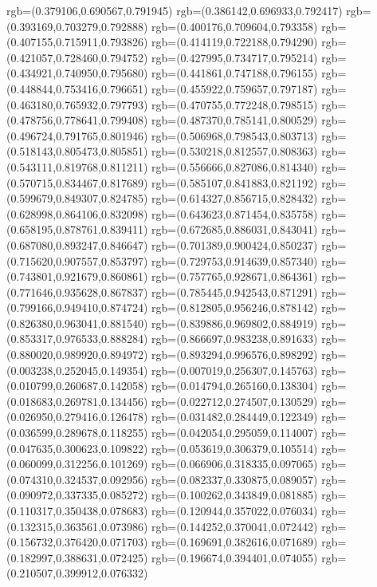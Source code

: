 {{{			rgb=(0.379106,0.690567,0.791945)
			rgb=(0.386142,0.696933,0.792417)
			rgb=(0.393169,0.703279,0.792888)
			rgb=(0.400176,0.709604,0.793358)
			rgb=(0.407155,0.715911,0.793826)
			rgb=(0.414119,0.722188,0.794290)
			rgb=(0.421057,0.728460,0.794752)
			rgb=(0.427995,0.734717,0.795214)
			rgb=(0.434921,0.740950,0.795680)
			rgb=(0.441861,0.747188,0.796155)
			rgb=(0.448844,0.753416,0.796651)
			rgb=(0.455922,0.759657,0.797187)
			rgb=(0.463180,0.765932,0.797793)
			rgb=(0.470755,0.772248,0.798515)
			rgb=(0.478756,0.778641,0.799408)
			rgb=(0.487370,0.785141,0.800529)
			rgb=(0.496724,0.791765,0.801946)
			rgb=(0.506968,0.798543,0.803713)
			rgb=(0.518143,0.805473,0.805851)
			rgb=(0.530218,0.812557,0.808363)
			rgb=(0.543111,0.819768,0.811211)
			rgb=(0.556666,0.827086,0.814340)
			rgb=(0.570715,0.834467,0.817689)
			rgb=(0.585107,0.841883,0.821192)
			rgb=(0.599679,0.849307,0.824785)
			rgb=(0.614327,0.856715,0.828432)
			rgb=(0.628998,0.864106,0.832098)
			rgb=(0.643623,0.871454,0.835758)
			rgb=(0.658195,0.878761,0.839411)
			rgb=(0.672685,0.886031,0.843041)
			rgb=(0.687080,0.893247,0.846647)
			rgb=(0.701389,0.900424,0.850237)
			rgb=(0.715620,0.907557,0.853797)
			rgb=(0.729753,0.914639,0.857340)
			rgb=(0.743801,0.921679,0.860861)
			rgb=(0.757765,0.928671,0.864361)
			rgb=(0.771646,0.935628,0.867837)
			rgb=(0.785445,0.942543,0.871291)
			rgb=(0.799166,0.949410,0.874724)
			rgb=(0.812805,0.956246,0.878142)
			rgb=(0.826380,0.963041,0.881540)
			rgb=(0.839886,0.969802,0.884919)
			rgb=(0.853317,0.976533,0.888284)
			rgb=(0.866697,0.983238,0.891633)
			rgb=(0.880020,0.989920,0.894972)
			rgb=(0.893294,0.996576,0.898292)
			rgb=(0.003238,0.252045,0.149354)
			rgb=(0.007019,0.256307,0.145763)
			rgb=(0.010799,0.260687,0.142058)
			rgb=(0.014794,0.265160,0.138304)
			rgb=(0.018683,0.269781,0.134456)
			rgb=(0.022712,0.274507,0.130529)
			rgb=(0.026950,0.279416,0.126478)
			rgb=(0.031482,0.284449,0.122349)
			rgb=(0.036599,0.289678,0.118255)
			rgb=(0.042054,0.295059,0.114007)
			rgb=(0.047635,0.300623,0.109822)
			rgb=(0.053619,0.306379,0.105514)
			rgb=(0.060099,0.312256,0.101269)
			rgb=(0.066906,0.318335,0.097065)
			rgb=(0.074310,0.324537,0.092956)
			rgb=(0.082337,0.330875,0.089057)
			rgb=(0.090972,0.337335,0.085272)
			rgb=(0.100262,0.343849,0.081885)
			rgb=(0.110317,0.350438,0.078683)
			rgb=(0.120944,0.357022,0.076034)
			rgb=(0.132315,0.363561,0.073986)
			rgb=(0.144252,0.370041,0.072442)
			rgb=(0.156732,0.376420,0.071703)
			rgb=(0.169691,0.382616,0.071689)
			rgb=(0.182997,0.388631,0.072425)
			rgb=(0.196674,0.394401,0.074055)
			rgb=(0.210507,0.399912,0.076332)
}}}
